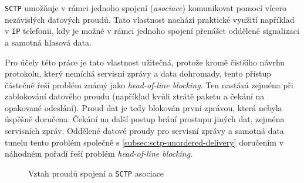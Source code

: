 \documentclass[thesis=M,czech]{FITthesis}[2012/10/20]
\begin{document}
    \texttt{SCTP} umožňuje v rámci jednoho spojení (\textit{asociace}) komunikovat pomocí vícero nezávislých datových proudů. Tato vlastnost nachází praktické využití například v \texttt{IP} telefonii, kdy je možné v rámci jednoho spojení přenášet odděleně signalizaci a samotná hlasová data.
    
    Pro účely této práce je tato vlastnost užitečná, protože kromě čistšího návrhu protokolu, který nemíchá servisní zprávy a data dohromady, tento přístup částečně řeší problém známý jako \textit{head-of-line blocking}. Ten nastává zejména při zablokování datového proudu (například kvůli ztrátě paketu a čekání na opakované odeslání). Proud dat je tedy blokován první zprávou, která nebyla úspěšně doručena. Čekání na další postup brání prostupu jiných dat, zejména servisních zpráv. Oddělené datové proudy pro servisní zprávy a samotná data tunelu tento problém společně s \ref{subsec:sctp-unordered-delivery} doručením v náhodném pořadí řeší problém \textit{head-of-line blocking}.
    
      
\begin{figure}[h]
 \centering

\caption{Vztah proudů spojení a \texttt{SCTP} asociace}
\label{diag:sctp-streams}
\end{figure}
    
\end{document}
